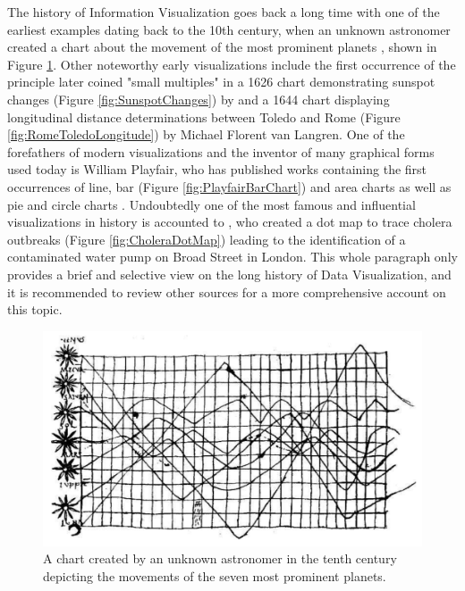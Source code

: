 The history of Information Visualization goes back a long time with one of the earliest examples dating back to the 10th century, when an unknown astronomer created a chart about the movement of the most prominent planets \parencite{CommentariiInSomniumScipionis}, shown in Figure \ref{fig:PlanetaryMovements}. Other noteworthy early visualizations include the first occurrence of the principle \cite{VisualDisplayOfQuantitativeInformation} later coined "small multiples" in a 1626 chart demonstrating sunspot changes (Figure \ref{fig:SunspotChanges}) by \cite{RosaUrsina} and a 1644 chart displaying longitudinal distance determinations between Toledo and Rome (Figure \ref{fig:RomeToledoLongitude}) by Michael Florent van Langren. One of the forefathers of modern visualizations and the inventor of many graphical forms used today is William Playfair, who has published works containing the first occurrences of line, bar (Figure \ref{fig:PlayfairBarChart}) and area charts \parencite{CommercialAndPoliticalAtlas} as well as pie and circle charts \parencite{StatisticalBreviary}. Undoubtedly one of the most famous and influential visualizations in history is accounted to \cite{ModeOfCommunicationOfCholera}, who created a dot map to trace cholera outbreaks (Figure \ref{fig:CholeraDotMap}) leading to the identification of a contaminated water pump on Broad Street in London. This whole paragraph only provides a brief and selective view on the long history of Data Visualization, and it is recommended to review other sources \parencite{BriefHistoryOfDataVis} for a more comprehensive account on this topic.  

\begin{figure}[tp]
    \centering
    \includegraphics[keepaspectratio,width=\linewidth,height=\fullh / 3]
    {images/planetary-movements.png}
    \caption[Chart of Planetary Movements from the Tenth Century]{
        A chart created by an unknown astronomer in the tenth century depicting the movements of the seven most prominent planets. 
    }
    \label{fig:PlanetaryMovements}
\end{figure}

